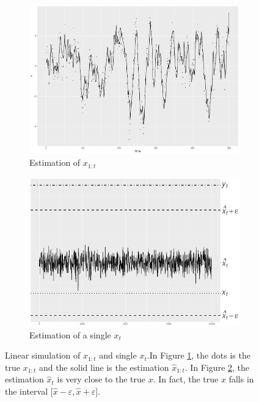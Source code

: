 \begin{figure}[h]
\centering
\begin{subfigure}[b]{0.45\textwidth}
    \includegraphics[width=\textwidth]{Chapters/05MCMCOU/plots/linearsimuXall.pdf}
     \caption{Estimation of $x_{1:t}$}\label{MCMClinearsimuXall}
\end{subfigure}
\begin{subfigure}[b]{0.45\textwidth}
	\includegraphics[width=\textwidth]{Chapters/05MCMCOU/plots/gglinearestXt2.pdf}
     \caption{Estimation of a single $x_t$}\label{MCMClinearsimuXt2}
\end{subfigure}
\caption{Linear simulation of $x_{1:t}$ and single $x_t$.In Figure \ref{MCMClinearsimuXall}, the dots is the true $x_{1:t}$ and the solid line is the estimation $\hat{x}_{1:t}$. In Figure \ref{MCMClinearsimuXt2}, the estimation $\hat{x}_t$ is very close to the true $x$. In fact, the true $x$ falls in the interval $\lbrack \hat{x}-\varepsilon,\hat{x}+\varepsilon\rbrack$.}
\label{linearmarginXt}
\end{figure}



